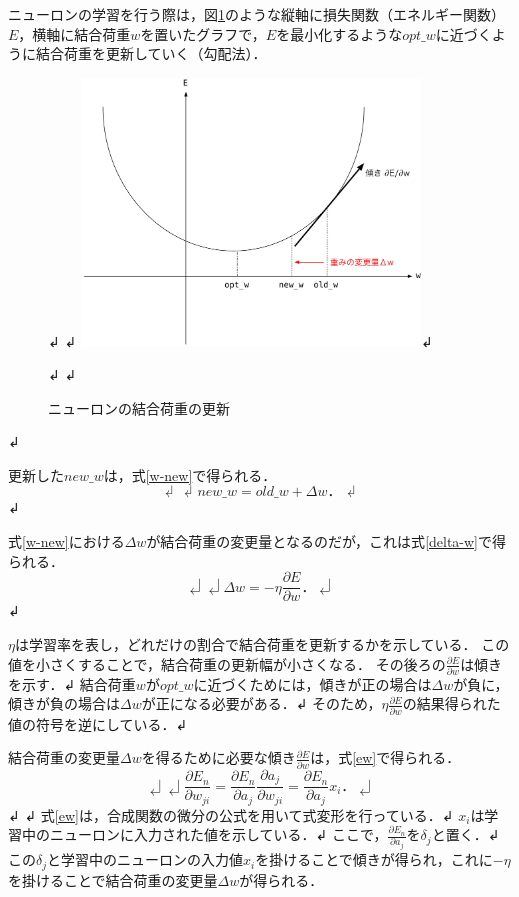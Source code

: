 ニューロンの学習を行う際は，図\ref{bp}のような縦軸に損失関数（エネルギー関数）$E$，横軸に結合荷重$w$を置いたグラフで，$E$を最小化するような$opt\_w$に近づくように結合荷重を更新していく（勾配法）．

\begin{figure}[hbtp]↲
    \centering↲
    \includegraphics[bb=0 0 749 592, width=9cm]{Figures/bp.pdf}↲
    \caption{ニューロンの結合荷重の更新}↲
    \label{bp}↲
\end{figure}↲

更新した$new\_w$は，式\ref{w-new}で得られる．
\begin{equation}↲
\label{w-new}↲
new\_w = old\_w + \Delta w．↲
\end{equation}↲

式\ref{w-new}における$\Delta w$が結合荷重の変更量となるのだが，これは式\ref{delta-w}で得られる．
\begin{equation}↲
\label{delta-w}↲
\Delta w = - \eta \frac{\partial E}{\partial w}．↲
\end{equation}↲

$\eta$は学習率を表し，どれだけの割合で結合荷重を更新するかを示している．
この値を小さくすることで，結合荷重の更新幅が小さくなる．
その後ろの$\frac{\partial E}{\partial w}$は傾きを示す．↲
結合荷重$w$が$opt\_w$に近づくためには，傾きが正の場合は$\Delta w$が負に，傾きが負の場合は$\Delta w$が正になる必要がある．↲
そのため，$\eta \frac{\partial E}{\partial w}$の結果得られた値の符号を逆にしている．↲

結合荷重の変更量$\Delta w$を得るために必要な傾き$\frac{\partial E}{\partial w}$は，式\ref{ew}で得られる．
\begin{equation}↲
\label{ew}↲
\frac{\partial E_n}{\partial w_{ji}} = \frac{\partial E_n}{\partial a_j} \frac{\partial a_j}{\partial w_{ji}} = \frac{\partial E_n}{\partial a_j} x_i．↲
\end{equation}↲
↲
式\ref{ew}は，合成関数の微分の公式を用いて式変形を行っている．↲
$x_i$は学習中のニューロンに入力された値を示している．↲
ここで，$\frac{\partial E_n}{\partial a_j}$を$\delta_j$と置く．↲
この$\delta_j$と学習中のニューロンの入力値$x_i$を掛けることで傾きが得られ，これに$- \eta$を掛けることで結合荷重の変更量$\Delta w$が得られる．

